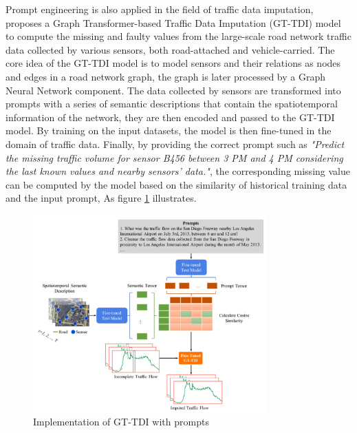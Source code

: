 \documentclass[runningheads]{llncs}
\begin{document}
\noindent \newline
Prompt engineering is also applied in the field of traffic data imputation, \cite{Zhang24} proposes a Graph Transformer-based Traffic Data Imputation (GT-TDI) model to compute the missing and faulty values from 
the large-scale road network traffic data collected by various sensors, both road-attached and vehicle-carried. The core idea of the GT-TDI model is to model sensors and their relations as nodes and edges in 
a road network graph, the graph is later processed by a Graph Neural Network component. The data collected by sensors are transformed into prompts with a series of semantic descriptions that contain the spatiotemporal information of the network,
they are then encoded and passed to the GT-TDI model. By training on the input datasets, the model is then fine-tuned in the domain of traffic data. Finally, by providing the correct prompt such as 
\textit{"Predict the missing traffic volume for sensor B456 between 3 PM and 4 PM considering the last known values and nearby sensors' data."}, the corresponding missing value can be computed by the model based on the similarity of historical training data
and the input prompt, As figure \ref{fig:TStreamLLM} illustrates. 

\begin{figure}[]
  \centering
  \includegraphics[width=0.8\textwidth]{GT-TDI.png}
  \caption{Implementation of GT-TDI with prompts \cite{Zhang24}}
  \label{fig:TStreamLLM}
\end{figure}
\end{document}
